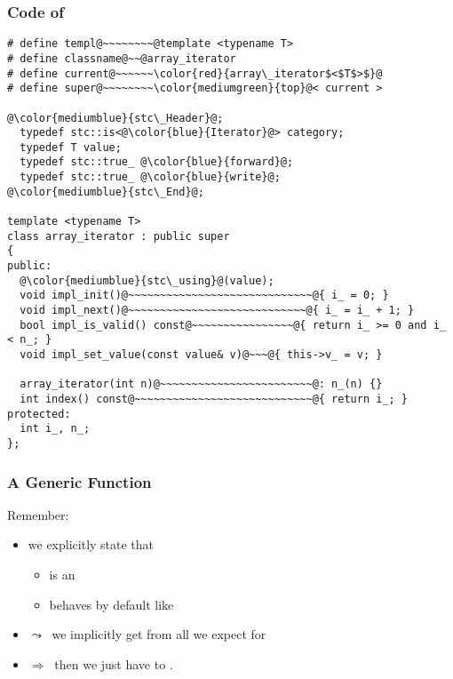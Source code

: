 \begin{frame}[fragile]
  \frametitle{Code of \bfarrayiteratorT}

\begin{lstlisting}[escapechar=@,basicstyle={\tiny\sffamily}]
# define templ@~~~~~~~~@template <typename T>
# define classname@~~@array_iterator
# define current@~~~~~~\color{red}{array\_iterator$<$T$>$}@
# define super@~~~~~~~~\color{mediumgreen}{top}@< current >

@\color{mediumblue}{stc\_Header}@;
  typedef stc::is<@\color{blue}{Iterator}@> category;
  typedef T value;
  typedef stc::true_ @\color{blue}{forward}@;
  typedef stc::true_ @\color{blue}{write}@;
@\color{mediumblue}{stc\_End}@;

template <typename T>
class array_iterator : public super
{
public:
  @\color{mediumblue}{stc\_using}@(value);
  void impl_init()@~~~~~~~~~~~~~~~~~~~~~~~~~~~~~@{ i_ = 0; }
  void impl_next()@~~~~~~~~~~~~~~~~~~~~~~~~~~~~@{ i_ = i_ + 1; }
  bool impl_is_valid() const@~~~~~~~~~~~~~~~~@{ return i_ >= 0 and i_ < n_; }
  void impl_set_value(const value& v)@~~~@{ this->v_ = v; }

  array_iterator(int n)@~~~~~~~~~~~~~~~~~~~~~~~~@: n_(n) {}
  int index() const@~~~~~~~~~~~~~~~~~~~~~~~~~~~~@{ return i_; }
protected:
  int i_, n_;
};
\end{lstlisting}

\end{frame}




\begin{frame}
  \frametitle{A Generic Function}

Remember:
\smallskip

\begin{itemize}
\scriptsize
\item we {\color{mediumgreen}explicitly} state that \bfhelloiteratorI
  \begin{itemize} \scriptsize
  \item is an \bfIterator
  \item behaves by default like \bfI
  \end{itemize}
\item $\leadsto ~ $ we {\color{mediumgreen}implicitly} get from \bfI all we expect for \bfhelloiteratorI
\item $\Rightarrow ~ $ then we just have to {\color{red}{override}} \bfinit.
\end{itemize}

\end{frame}



